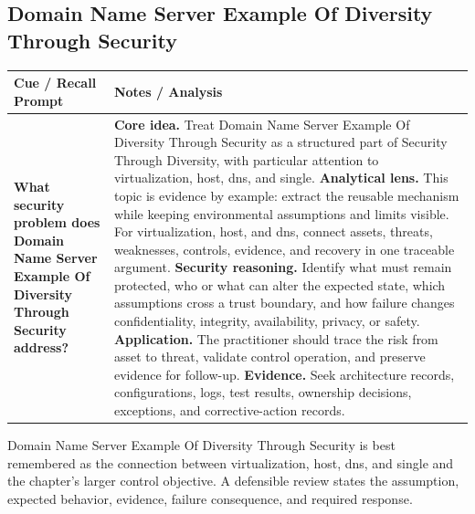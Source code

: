 \documentclass[11pt]{article}
\newcommand{\CornellHeader}{%
\rowcolor{Navy}\color{white}\bfseries Cue / Recall Prompt & \color{white}\bfseries Notes / Analysis\\\hline}
\newcommand{\CornellRow}[2]{%
\cellcolor{CueGray}\RaggedRight\textbf{#1} & \RaggedRight #2\\\hline}
\begin{document}
\subsection*{Domain Name Server Example Of Diversity Through Security}
\begin{longtable}{>{\RaggedRight\arraybackslash}p{}|>{\RaggedRight\arraybackslash}p{}}
\CornellHeader
\CornellRow{What security problem does Domain Name Server Example Of Diversity Through Security address?}{\textbf{Core idea.} Treat Domain Name Server Example Of Diversity Through Security as a structured part of Security Through Diversity, with particular attention to virtualization, host, dns, and single. \textbf{Analytical lens.} This topic is evidence by example: extract the reusable mechanism while keeping environmental assumptions and limits visible. For virtualization, host, and dns, connect assets, threats, weaknesses, controls, evidence, and recovery in one traceable argument. \textbf{Security reasoning.} Identify what must remain protected, who or what can alter the expected state, which assumptions cross a trust boundary, and how failure changes confidentiality, integrity, availability, privacy, or safety. \textbf{Application.} The practitioner should trace the risk from asset to threat, validate control operation, and preserve evidence for follow-up. \textbf{Evidence.} Seek architecture records, configurations, logs, test results, ownership decisions, exceptions, and corrective-action records.}
\end{longtable}
\begin{topicsummary}
Domain Name Server Example Of Diversity Through Security is best remembered as the connection between virtualization, host, dns, and single and the chapter's larger control objective. A defensible review states the assumption, expected behavior, evidence, failure consequence, and required response.
\end{topicsummary}
\end{document}
